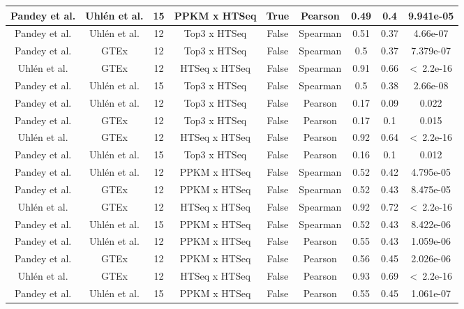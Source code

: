 \begin{landscape}
\begin{longtable}{@{}ccccccccc@{}}
Pandey et al. & Uhlén et al. & 15 & PPKM x HTSeq & True & Pearson & 0.49 & 0.4 & 9.941e-05 \\* \midrule
Pandey et al. & Uhlén et al. & 12 & Top3 x HTSeq & False & Spearman & 0.51 & 0.37 & 4.66e-07 \\
Pandey et al. & GTEx & 12 & Top3 x HTSeq & False & Spearman & 0.5 & 0.37 & 7.379e-07 \\
{\color[HTML]{9B9B9B} Uhlén et al.} & {\color[HTML]{9B9B9B} GTEx} & {\color[HTML]{9B9B9B} 12} & {\color[HTML]{9B9B9B} HTSeq x HTSeq} & {\color[HTML]{9B9B9B} False} & {\color[HTML]{9B9B9B} Spearman} & {\color[HTML]{9B9B9B} 0.91} & {\color[HTML]{9B9B9B} 0.66} & {\color[HTML]{9B9B9B} \textless\ 2.2e-16} \\
Pandey et al. & Uhlén et al. & 15 & Top3 x HTSeq & False & Spearman & 0.5 & 0.38 & 2.66e-08 \\
Pandey et al. & Uhlén et al. & 12 & Top3 x HTSeq & False & Pearson & 0.17 & 0.09 & 0.022 \\
Pandey et al. & GTEx & 12 & Top3 x HTSeq & False & Pearson & 0.17 & 0.1 & 0.015 \\
{\color[HTML]{9B9B9B} Uhlén et al.} & {\color[HTML]{9B9B9B} GTEx} & {\color[HTML]{9B9B9B} 12} & {\color[HTML]{9B9B9B} HTSeq x HTSeq} & {\color[HTML]{9B9B9B} False} & {\color[HTML]{9B9B9B} Pearson} & {\color[HTML]{9B9B9B} 0.92} & {\color[HTML]{9B9B9B} 0.64} & {\color[HTML]{9B9B9B} \textless\ 2.2e-16} \\
Pandey et al. & Uhlén et al. & 15 & Top3 x HTSeq & False & Pearson & 0.16 & 0.1 & 0.012 \\
Pandey et al. & Uhlén et al. & 12 & PPKM x HTSeq & False & Spearman & 0.52 & 0.42 & 4.795e-05 \\
Pandey et al. & GTEx & 12 & PPKM x HTSeq & False & Spearman & 0.52 & 0.43 & 8.475e-05 \\
{\color[HTML]{9B9B9B} Uhlén et al.} & {\color[HTML]{9B9B9B} GTEx} & {\color[HTML]{9B9B9B} 12} & {\color[HTML]{9B9B9B} HTSeq x HTSeq} & {\color[HTML]{9B9B9B} False} & {\color[HTML]{9B9B9B} Spearman} & {\color[HTML]{9B9B9B} 0.92} & {\color[HTML]{9B9B9B} 0.72} & {\color[HTML]{9B9B9B} \textless\ 2.2e-16} \\
Pandey et al. & Uhlén et al. & 15 & PPKM x HTSeq & False & Spearman & 0.52 & 0.43 & 8.422e-06 \\
Pandey et al. & Uhlén et al. & 12 & PPKM x HTSeq & False & Pearson & 0.55 & 0.43 & 1.059e-06 \\
Pandey et al. & GTEx & 12 & PPKM x HTSeq & False & Pearson & 0.56 & 0.45 & 2.026e-06 \\
{\color[HTML]{9B9B9B} Uhlén et al.} & {\color[HTML]{9B9B9B} GTEx} & {\color[HTML]{9B9B9B} 12} & {\color[HTML]{9B9B9B} HTSeq x HTSeq} & {\color[HTML]{9B9B9B} False} & {\color[HTML]{9B9B9B} Pearson} & {\color[HTML]{9B9B9B} 0.93} & {\color[HTML]{9B9B9B} 0.69} & {\color[HTML]{9B9B9B} \textless\ 2.2e-16} \\
Pandey et al. & Uhlén et al. & 15 & PPKM x HTSeq & False & Pearson & 0.55 & 0.45 & 1.061e-07 \\* \bottomrule
\end{longtable}
\end{landscape}

